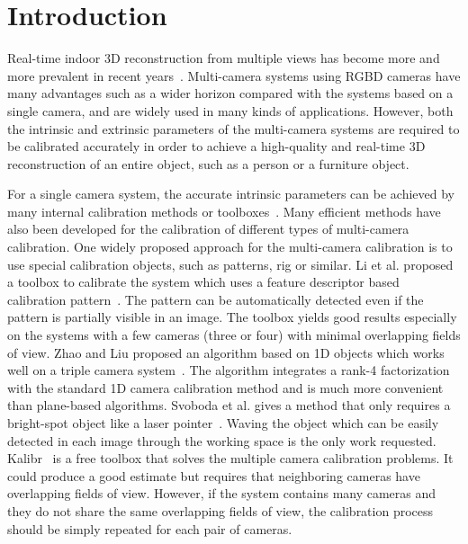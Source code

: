 
\section{Introduction}

Real-time indoor 3D reconstruction from multiple views has become more and more prevalent in recent years~\cite{dou2016fusion4d,orts2016holoportation}. Multi-camera systems using RGBD cameras have many advantages such as a wider horizon compared with the systems based on a single camera, and are widely used in many kinds of applications. However, both the intrinsic and extrinsic parameters of the multi-camera systems are required to be calibrated accurately in order to achieve a high-quality and real-time 3D reconstruction of an entire object, such as a person or a furniture object.

For a single camera system, the accurate intrinsic parameters can be achieved by many internal calibration methods or toolboxes~\cite{zhang2000flexible,zhang2004camera}. Many efficient methods have also been developed for the calibration of different types of multi-camera calibration. 
%
One widely proposed approach for the multi-camera calibration is to use special calibration objects, such as patterns, rig or similar. 
Li et al. proposed a toolbox to calibrate the system which uses a feature descriptor based calibration pattern~\cite{Li2013A}. 
%
The pattern can be automatically detected even if the pattern is partially visible in an image. The toolbox yields good results especially on the systems with a few cameras (three or four) with minimal overlapping fields of view. 
%
Zhao and Liu proposed an algorithm based on 1D objects  which works well on a triple camera system~\cite{zhao2008practical}. The algorithm integrates a rank-4 factorization with the standard 1D camera calibration method and is much more convenient than plane-based algorithms. 
Svoboda et al. gives a method that only requires a bright-spot object like a laser pointer~\cite{svoboda2005convenient}. Waving the object which can be easily detected in each image through the working space is the only work requested. 
Kalibr~\cite{Maye2013Self} is a free toolbox that solves the multiple camera calibration problems. 
%
It could produce a good estimate but requires that neighboring cameras have overlapping fields of view. 
However, if the system contains many cameras and they do not share the same overlapping fields of view, the calibration process should be simply repeated for each pair of cameras.

